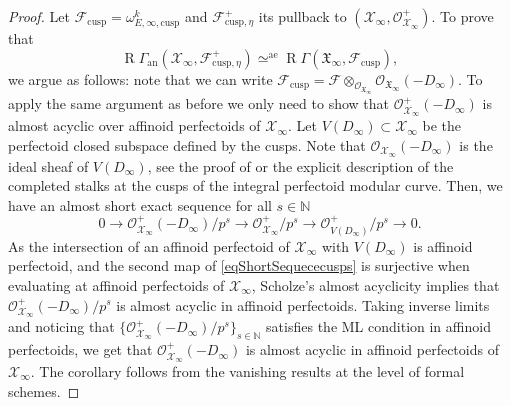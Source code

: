 \documentclass[11pt]{article}
\newcommand{\rae}{\mathrm{ae}}
\newcommand{\an}{\mathrm{an}}
\newcommand{\cusp}{\mathrm{cusp}}
\numberwithin{equation}{section}
\theoremstyle{definition}
\newcommand{\bb}[1]{\mathbb{#1}}
\newcommand{\n}[1]{\mathcal{#1}}
\newcommand{\f}[1]{\mathfrak{#1}}
\newcommand{\s}[1]{\mathscr{#1}}
\DeclareMathOperator{\R}{R}
\begin{document}
\begin{proof}
Let $\n{F}_{\cusp}=\omega_{E,\infty,\cusp}^{k}$ and $\n{F}^+_{\cusp, \eta}$ its pullback to $(\n{X}_{\infty}, \s{O}^+_{\n{X}_{\infty}})$. To prove that
\[
\R\Gamma_{\an}(\n{X}_{\infty}, \n{F}^+_{\cusp,\eta}) \simeq^{\rae} \R\Gamma(\f{X}_{\infty}, \n{F}_{\cusp}),
\]
we argue as follows: note that we can write $\n{F}_{\cusp}= \n{F}\otimes_{\s{O}_{\f{X}_{\infty}}} \s{O}_{\f{X}_{\infty}}(-D_{\infty})$. To apply the same argument as before we only need to show that $\s{O}_{\n{X}_{\infty}}^+(-D_{\infty})$ is almost acyclic over affinoid perfectoids of $\n{X}_{\infty}$. Let $V(D_{\infty})\subset \n{X}_{\infty}$ be the perfectoid closed subspace defined by the cusps. Note that $\s{O}_{\n{X}_{\infty}}(-D_\infty)$ is the ideal sheaf of $V(D_{\infty})$, see the proof of \cite[Th.\,IV.2.1]{scholzeTorsCoho2015} or the explicit description of the completed stalks at the cusps of the integral perfectoid modular curve. Then, we have an almost short exact sequence for all $s\in \bb{N}$
\begin{equation}
\label{eqShortSequececusps}
0\to \s{O}^+_{\n{X}_{\infty}}(-D_{\infty})/p^s \to \s{O}^+_{\n{X}_{\infty}}/p^s \to \s{O}^+_{V(D_{\infty})}/p^s \to 0.
\end{equation}
As the intersection of an affinoid perfectoid of $\n{X}_{\infty}$ with $V(D_{\infty})$ is affinoid perfectoid, and the second map of \eqref{eqShortSequececusps} is surjective when evaluating at affinoid perfectoids of $\n{X}_{\infty}$, Scholze's almost acyclicity implies that $\s{O}^+_{\n{X}_{\infty}}(-D_{\infty})/p^s$ is almost acyclic in affinoid perfectoids. Taking inverse limits and noticing that $\{\s{O}^+_{\n{X}_{\infty}}(-D_{\infty})/p^s \}_{s\in \bb{N}}$ satisfies the ML condition in affinoid perfectoids, we get that $\s{O}^+_{\n{X}_{\infty}}(-D_{\infty})$ is almost acyclic in affinoid perfectoids of $\n{X}_{\infty}$. The corollary follows from the vanishing results at the level of formal schemes.
\end{proof}
\end{document}
